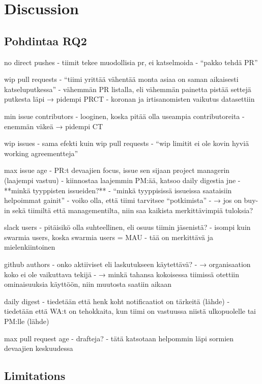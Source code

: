 \chapter{Discussion}



\section{Pohdintaa RQ2}

no direct pushes
    - tiimit tekee muodollisia pr, ei katselmoida
    - “pakko tehdä PR”
    
wip pull requests
    - “tiimi yrittää vähentää monta asiaa on saman aikaisesti katseluputkessa”
    - vähemmän PR listalla, eli vähemmän painetta pistää settejä putkesta läpi → pidempi PRCT
    - koronan ja irtisanomisten vaikutus datasettiin
    
min issue contributors
    - looginen, koska pitää olla useampia contributoreita
    - enemmän väkeä → pidempi CT
    
wip issues
    - sama efekti kuin wip pull requests
    - “wip limitit ei ole kovin hyviä working agreementteja”
    
max issue age
    - PR:t devaajien focus, issue sen sijaan project managerin (laajempi vastuu)
    - kiinnostaa laajemmin PM:ää, katsoo daily digestia jne
    - **minkä tyyppisten issueiden?**
        - “minkä tyyppisissä issueissa saataisiin helpoimmat gainit”
    - voiko olla, että tiimi tarvitsee “potkimista”
    - → jos on buy-in sekä tiimiltä että managementilta, niin saa kaikista merkittävimpiä tuloksia?
    
slack users
    - pitäisikö olla suhteellinen, eli osuus tiimin jäsenistä?
    - isompi kuin swarmia users, koska swarmia users = MAU
    - tää on merkittävä ja mielenkiintoinen
    
github authors
    - onko aktiiviset eli laskutukseen käytettävä?
    - → organisaation koko ei ole vaikuttava tekijä
    - → minkä tahansa kokoisessa tiimissä otettiin ominaisuuksia käyttöön, niin muutosta saatiin aikaan
    
daily digest
    - tiedetään että henk koht notificaatiot on tärkeitä (lähde)
    - tiedetään että WA:t on tehokkaita, kun tiimi on vastuussa niistä ulkopuolelle tai PM:lle (lähde)
    
max pull request age
    - drafteja?
    - tätä katsotaan helpommin läpi sormien devaajien keskuudessa







\section{Limitations}
